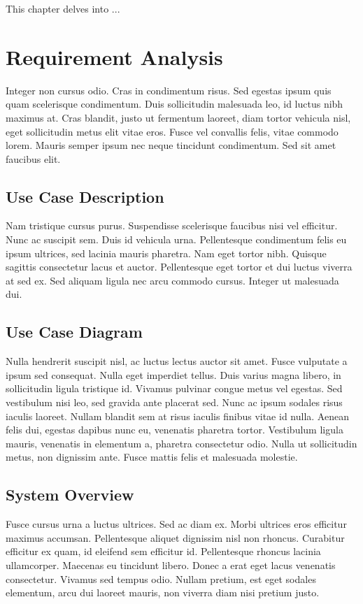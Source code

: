 This chapter delves into ...

\section{Requirement Analysis}
Integer non cursus odio. Cras in condimentum risus. Sed egestas ipsum quis quam scelerisque condimentum. Duis sollicitudin malesuada leo, id luctus nibh maximus at. Cras blandit, justo ut fermentum laoreet, diam tortor vehicula nisl, eget sollicitudin metus elit vitae eros. Fusce vel convallis felis, vitae commodo lorem. Mauris semper ipsum nec neque tincidunt condimentum. Sed sit amet faucibus elit.

\subsection{Use Case Description}
Nam tristique cursus purus. Suspendisse scelerisque faucibus nisi vel efficitur. Nunc ac suscipit sem. Duis id vehicula urna. Pellentesque condimentum felis eu ipsum ultrices, sed lacinia mauris pharetra. Nam eget tortor nibh. Quisque sagittis consectetur lacus et auctor. Pellentesque eget tortor et dui luctus viverra at sed ex. Sed aliquam ligula nec arcu commodo cursus. Integer ut malesuada dui.

\subsection{Use Case Diagram}
Nulla hendrerit suscipit nisl, ac luctus lectus auctor sit amet. Fusce vulputate a ipsum sed consequat. Nulla eget imperdiet tellus. Duis varius magna libero, in sollicitudin ligula tristique id. Vivamus pulvinar congue metus vel egestas. Sed vestibulum nisi leo, sed gravida ante placerat sed. Nunc ac ipsum sodales risus iaculis laoreet. Nullam blandit sem at risus iaculis finibus vitae id nulla. Aenean felis dui, egestas dapibus nunc eu, venenatis pharetra tortor. Vestibulum ligula mauris, venenatis in elementum a, pharetra consectetur odio. Nulla ut sollicitudin metus, non dignissim ante. Fusce mattis felis et malesuada molestie.

\subsection{System Overview}
Fusce cursus urna a luctus ultrices. Sed ac diam ex. Morbi ultrices eros efficitur maximus accumsan. Pellentesque aliquet dignissim nisl non rhoncus. Curabitur efficitur ex quam, id eleifend sem efficitur id. Pellentesque rhoncus lacinia ullamcorper. Maecenas eu tincidunt libero. Donec a erat eget lacus venenatis consectetur. Vivamus sed tempus odio. Nullam pretium, est eget sodales elementum, arcu dui laoreet mauris, non viverra diam nisi pretium justo.

